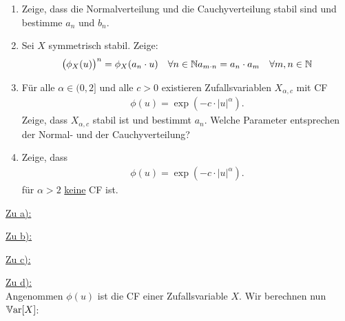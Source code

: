 \documentclass[12pt,a4paper]{article}
\begin{document}
\begin{enumerate}[label=\alph*)]
	\item Zeige, dass die Normalverteilung und die Cauchyverteilung stabil sind und bestimme $a_n$ und $b_n$.
	\item Sei $X$ symmetrisch stabil.
	Zeige:
	\begin{align*}
		\big(\phi_X(u)\big)^n&=\phi_X(a_n\cdot u) & \forall n\in\mathbb{N}
		a_{m\cdot n}&=a_n\cdot a_m &\forall m,n\in\mathbb{N}
	\end{align*}		
	\item Für alle $\alpha\in(0,2]$ und alle $c>0$ existieren Zufallsvariablen $X_{\alpha,c}$ mit CF 
	\begin{align*}
		\phi(u)=\exp\left(-c\cdot|u|^\alpha\right).
	\end{align*}
	Zeige, dass $X_{\alpha,c}$ stabil ist und bestimmt $a_n$.
	Welche Parameter entsprechen der Normal- und der Cauchyverteilung?
	\item Zeige, dass
	\begin{align*}
		\phi(u)=\exp\left(-c\cdot|u|^\alpha\right).
	\end{align*}
	für $\alpha>2$ \ul{keine} CF ist.
\end{enumerate}

\begin{lösung}
	\underline{Zu a):}
	
	\underline{Zu b):}
	
	\underline{Zu c):}
	
	\underline{Zu d):}\\
	Angenommen $\phi(u)$ ist die CF einer Zufallsvariable $X$.
	Wir berechnen nun $\mathbb{V}\text{ar}[X]$:
	
\end{lösung}
\end{document}
